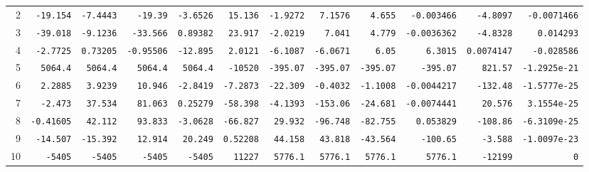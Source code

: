 \begin{landscape}
\begin{tabular}{rrrrrrrrrrrr}
2 & \texttt{-19.154} & \texttt{-7.4443} & \texttt{-19.39} & \texttt{-3.6526} & \texttt{15.136} & \texttt{-1.9272} & \texttt{7.1576} & \texttt{4.655} & \texttt{-0.003466} & \texttt{-4.8097} & \texttt{-0.0071466} \\

3 & \texttt{-39.018} & \texttt{-9.1236} & \texttt{-33.566} & \texttt{0.89382} & \texttt{23.917} & \texttt{-2.0219} & \texttt{7.041} & \texttt{4.779} & \texttt{-0.0036362} & \texttt{-4.8328} & \texttt{0.014293} \\

4 & \texttt{-2.7725} & \texttt{0.73205} & \texttt{-0.95506} & \texttt{-12.895} & \texttt{2.0121} & \texttt{-6.1087} & \texttt{-6.0671} & \texttt{6.05} & \texttt{6.3015} & \texttt{0.0074147} & \texttt{-0.028586} \\

5 & \texttt{5064.4} & \texttt{5064.4} & \texttt{5064.4} & \texttt{5064.4} & \texttt{-10520} & \texttt{-395.07} & \texttt{-395.07} & \texttt{-395.07} & \texttt{-395.07} & \texttt{821.57} & \texttt{-1.2925e-21} \\

6 & \texttt{2.2885} & \texttt{3.9239} & \texttt{10.946} & \texttt{-2.8419} & \texttt{-7.2873} & \texttt{-22.309} & \texttt{-0.4032} & \texttt{-1.1008} & \texttt{-0.0044217} & \texttt{-132.48} & \texttt{-1.5777e-25} \\

7 & \texttt{-2.473} & \texttt{37.534} & \texttt{81.063} & \texttt{0.25279} & \texttt{-58.398} & \texttt{-4.1393} & \texttt{-153.06} & \texttt{-24.681} & \texttt{-0.0074441} & \texttt{20.576} & \texttt{3.1554e-25} \\

8 & \texttt{-0.41605} & \texttt{42.112} & \texttt{93.833} & \texttt{-3.0628} & \texttt{-66.827} & \texttt{29.932} & \texttt{-96.748} & \texttt{-82.755} & \texttt{0.053829} & \texttt{-108.86} & \texttt{-6.3109e-25} \\

9 & \texttt{-14.507} & \texttt{-15.392} & \texttt{12.914} & \texttt{20.249} & \texttt{0.52208} & \texttt{44.158} & \texttt{43.818} & \texttt{-43.564} & \texttt{-100.65} & \texttt{-3.588} & \texttt{-1.0097e-23} \\

10 & \texttt{-5405} & \texttt{-5405} & \texttt{-5405} & \texttt{-5405} & \texttt{11227} & \texttt{5776.1} & \texttt{5776.1} & \texttt{5776.1} & \texttt{5776.1} & \texttt{-12199} & \texttt{0} \\


\end{tabular}
\end{landscape}
